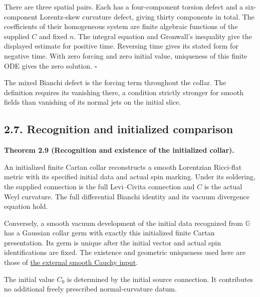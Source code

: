 \documentclass[
  english,
  11pt,
  reqno]{amsart}
\makeatletter
\newcommand{\paperdisplaynext}{%
  \let\paper@savedstartsection\@startsection
  \def\@startsection##1##2##3##4##5##6{%
    \let\@startsection\paper@savedstartsection
    \@tempskipa ##5\relax
    \ifdim\@tempskipa<\z@
      \def\paper@afterskip{.35\baselineskip}%
    \else
      \def\paper@afterskip{##5}%
    \fi
    \@startsection{##1}{##2}{##3}{##4}{\paper@afterskip}{##6}}}
\newcommand{\paperdisplaysection}{\paperdisplaynext\subsection}
\newcommand{\pandocstatementheading}[1]{%
  \par\if@nobreak\else
    \addpenalty{\@beginparpenalty}%
    \addvspace{.5\baselineskip plus .2\baselineskip minus .2\baselineskip}%
  \fi
  {\normalfont\bfseries #1\par}%
  \nobreak\@afterindenttrue\@afterheading
}
\let\paper@displaysection\paperdisplaysection
\renewcommand{\paperdisplaysection}[1]{%
  \let\paper@savedhangfrom\@hangfrom
  \long\def\@hangfrom##1##2{%
    \paper@savedhangfrom{##1}{\paper@headingparagraph##2}}%
  \paper@displaysection{#1}%
  \let\@hangfrom\paper@savedhangfrom}
\makeatother
\begin{document}
There are three spatial pairs. Each has a four-component torsion defect
and a six-component Lorentz-skew curvature defect, giving thirty
components in total. The coefficients of their homogeneous system are
finite algebraic functions of the supplied \(C\) and fixed \(n\). The
integral equation and Gronwall's inequality give the displayed estimate
for positive time. Reversing time gives its stated form for negative
time. With zero forcing and zero initial value, uniqueness of this
finite ODE gives the zero solution. \hfill\(\square\)

The mixed Bianchi defect is the forcing term throughout the collar. The
definition requires its vanishing there, a condition strictly stronger
for smooth fields than vanishing of its normal jets on the initial
slice.

\paperdisplaysection{2.7. Recognition and initialized
comparison}\label{recognition-and-initialized-comparison}\label{sec:online-cartan-recognition-comparison}

\pandocstatementheading{\leavevmode{}\label{thm:online-cartan-collar-recognition}Theorem 2.9 (Recognition and existence of the initialized collar).}

An initialized finite Cartan collar reconstructs a smooth Lorentzian
Ricci-flat metric with its specified initial data and actual spin
marking. Under its soldering, the supplied connection is the full
Levi--Civita connection and \(C\) is the actual Weyl curvature. The full
differential Bianchi identity and its vacuum divergence equation hold.

Conversely, a smooth vacuum development of the initial data recognized
from \(\mathbb G\) has a Gaussian collar germ with exactly this
initialized finite Cartan presentation. Its germ is unique after the
initial vector and actual spin identifications are fixed. The existence
and geometric uniqueness used here are those of
\hyperref[thm:online-smooth-local-cauchy-input]{the external smooth
Cauchy input}.

The initial value \(C_0\) is determined by the initial source
connection. It contributes no additional freely prescribed
normal-curvature datum.
\end{document}
